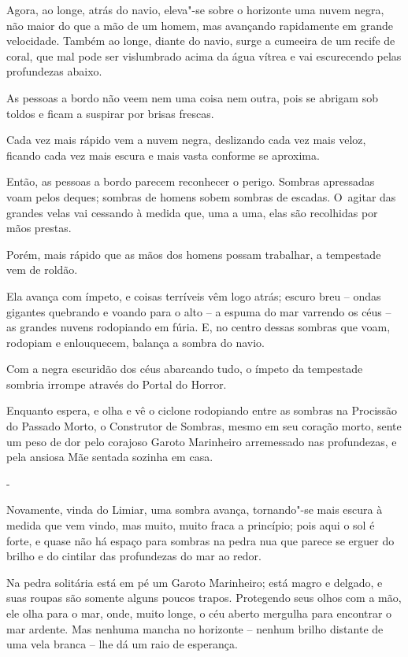 Agora, ao longe, atrás do navio, eleva"-se sobre o horizonte uma nuvem
negra, não maior do que a mão de um homem, mas avançando rapidamente em
grande velocidade. Também ao longe, diante do navio, surge a cumeeira de
um recife de coral, que mal pode ser vislumbrado acima da água vítrea e
vai escurecendo pelas profundezas abaixo.

As pessoas a bordo não veem nem uma coisa nem outra, pois se abrigam sob
toldos e ficam a suspirar por brisas frescas.

Cada vez mais rápido vem a nuvem negra, deslizando cada vez mais veloz,
ficando cada vez mais escura e mais vasta conforme se aproxima.

Então, as pessoas a bordo parecem reconhecer o perigo. Sombras
apressadas voam pelos deques; sombras de homens sobem sombras de
escadas. O~agitar das grandes velas vai cessando à medida que, uma a
uma, elas são recolhidas por mãos prestas.

Porém, mais rápido que as mãos dos homens possam trabalhar, a tempestade
vem de roldão.

Ela avança com ímpeto, e coisas terríveis vêm logo atrás; escuro breu --
ondas gigantes quebrando e voando para o alto -- a espuma do mar
varrendo os céus -- as grandes nuvens rodopiando em fúria. E, no centro
dessas sombras que voam, rodopiam e enlouquecem, balança a sombra do
navio.

Com a negra escuridão dos céus abarcando tudo, o ímpeto da tempestade
sombria irrompe através do Portal do Horror.

Enquanto espera, e olha e vê o ciclone rodopiando entre as sombras na
Procissão do Passado Morto, o Construtor de Sombras, mesmo em seu
coração morto, sente um peso de dor pelo corajoso Garoto Marinheiro
arremessado nas profundezas, e pela ansiosa Mãe sentada sozinha em casa.

-

Novamente, vinda do Limiar, uma sombra avança, tornando"-se mais escura à
medida que vem vindo, mas muito, muito fraca a princípio; pois aqui o
sol é forte, e quase não há espaço para sombras na pedra nua que parece
se erguer do brilho e do cintilar das profundezas do mar ao redor.

Na pedra solitária está em pé um Garoto Marinheiro; está magro e
delgado, e suas roupas são somente alguns poucos trapos. Protegendo seus
olhos com a mão, ele olha para o mar, onde, muito longe, o céu aberto
mergulha para encontrar o mar ardente. Mas nenhuma mancha no horizonte
-- nenhum brilho distante de uma vela branca -- lhe dá um raio de
esperança.

